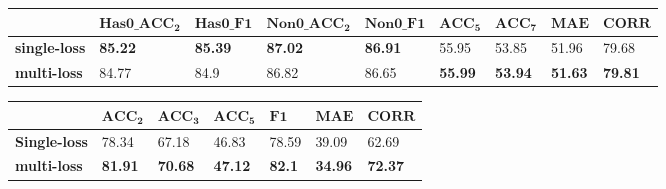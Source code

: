 \documentclass[11pt]{article}
\begin{document}
\begin{table*}
\centering
\begin{subtable}{\textwidth}
\centering
\small
\setlength{\tabcolsep}{3pt}
\renewcommand{\arraystretch}{1.2}
\begin{tabular}{lllllllll}
\hline
 & $\mathbf{Has0\_ACC_2}$ & $\mathbf{Has0\_F1}$ & $\mathbf{Non0\_ACC_2}$ & $\mathbf{Non0\_F1}$ & $\mathbf{ACC_5}$ & $\mathbf{ACC_7}$ & $\mathbf{MAE}$ & $\mathbf{CORR}$ \\ \hline
\textbf{single-loss} & \textbf{85.22} & \textbf{85.39} & \textbf{87.02} & \textbf{86.91} & 55.95 & 53.85 & 51.96 & 79.68 \\ \hline
\textbf{multi-loss} & 84.77 & 84.9 & 86.82 & 86.65 & \textbf{55.99} & \textbf{53.94} & \textbf{51.63} & \textbf{79.81} \\ \hline
\end{tabular}
\caption{CMU-MOSEI}
\label{tab:CMU-MOSEI3}
\end{subtable}
\vspace{0.3cm}
\begin{subtable}{\textwidth}
\centering
\small
\setlength{\tabcolsep}{3pt}
\renewcommand{\arraystretch}{1.2}
\begin{tabular}{lllllll}
\hline
 & $\mathbf{ACC_2}$ & $\mathbf{ACC_3}$ & $\mathbf{ACC_5}$ & $\mathbf{F1}$ & $\mathbf{MAE}$ & $\mathbf{CORR}$ \\ \hline
\textbf{Single-loss} & 78.34 & 67.18 & 46.83 & 78.59 & 39.09 & 62.69 \\ \hline
\textbf{multi-loss} & \textbf{81.91} & \textbf{70.68} & \textbf{47.12} & \textbf{82.1} & \textbf{34.96} & \textbf{72.37} \\ \hline
\end{tabular}
\caption{CH-SIMS}
\label{tab:CH-SIMS3}
\end{subtable}
\caption{\textbf{Single-Loss Training vs.~Multi-Loss Training}: While multi-loss training does not yield performance improvement when identical labels are used for different losses, as in the case of CMU-MOSEI, it does contribute significantly to performance enhancement when unique labels are assigned to each modality, as observed with CH-SIMS.}
\label{tab:Performance4}
\end{table*}
\end{document}
